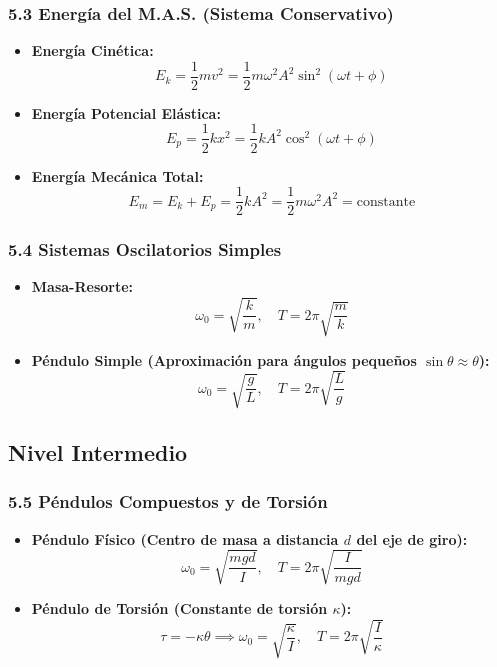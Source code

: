 \documentclass[11pt,a4paper]{article}
\begin{document}
\subsubsection*{5.3 Energía del M.A.S. (Sistema Conservativo)}

\begin{itemize}
  \item \textbf{Energía Cinética:}
  \[
    E_k = \frac{1}{2} m v^2 = \frac{1}{2} m \omega^2 A^2 \sin^2(\omega t + \phi)
  \]
  \item \textbf{Energía Potencial Elástica:}
  \[
    E_p = \frac{1}{2} k x^2 = \frac{1}{2} k A^2 \cos^2(\omega t + \phi)
  \]
  \item \textbf{Energía Mecánica Total:}
  \[
    E_m = E_k + E_p = \frac{1}{2} k A^2 = \frac{1}{2} m \omega^2 A^2 = \text{constante}
  \]
\end{itemize}

\subsubsection*{5.4 Sistemas Oscilatorios Simples}

\begin{itemize}
  \item \textbf{Masa-Resorte:}
  \[
    \omega_0 = \sqrt{\frac{k}{m}}, \quad T = 2\pi\sqrt{\frac{m}{k}}
  \]
  \item \textbf{Péndulo Simple (Aproximación para ángulos pequeños $\sin\theta \approx \theta$):}
  \[
    \omega_0 = \sqrt{\frac{g}{L}}, \quad T = 2\pi\sqrt{\frac{L}{g}}
  \]
\end{itemize}

\subsection*{Nivel Intermedio}

\subsubsection*{5.5 Péndulos Compuestos y de Torsión}

\begin{itemize}
  \item \textbf{Péndulo Físico (Centro de masa a distancia $d$ del eje de giro):}
  \[
    \omega_0 = \sqrt{\frac{m g d}{I}}, \quad T = 2\pi\sqrt{\frac{I}{m g d}}
  \]
  \item \textbf{Péndulo de Torsión (Constante de torsión $\kappa$):}
  \[
    \tau = -\kappa \theta \implies \omega_0 = \sqrt{\frac{\kappa}{I}}, \quad T = 2\pi\sqrt{\frac{I}{\kappa}}
  \]
\end{itemize}
\end{document}
